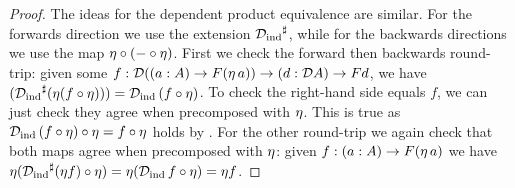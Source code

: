 \documentclass[11pt]{article}
\begin{document}
\begin{proof}
  The ideas for the dependent product equivalence are similar.
  For the forwards direction we use the extension \({\mathcal{D}_\text{ind}}^\sharp\),
  while for the backwards directions we use the map
  \(\eta \circ (-\circ\eta)\).
  First we check the forward then backwards round-trip: given some
  \(f : \mathcal{D}{({{(a:A)}\to{F(\eta\,{a})}})}\to{{(d:\mathcal{D}{A})}\to{Fd}}\),
  we have
  \(
    ({\mathcal{D}_\text{ind}}^\sharp(\eta (f\circ\eta)))
    =
    \mathcal{D}_\text{ind}\,{(f\circ\eta)}
  \).
  To check the right-hand side equals \(f\), we can just check they agree
  when precomposed with \(\eta\).
  This is true as
  \(\mathcal{D}_\text{ind}\,{(f\circ\eta)}\circ\eta = f\circ\eta\)
  holds by .
  For the other round-trip we again check that both maps
  agree when precomposed with \(\eta\): given
  \(f : {{(a:A)}\to{F(\eta\,{a})}}\) we have
  \(
    \eta{({\mathcal{D}_\text{ind}}^\sharp(\eta{f})\circ\eta)}
    =
    \eta{(\mathcal{D}_\text{ind}\,{f}\circ\eta)}
    =
    \eta{f}
   \).
\end{proof}
\end{document}
